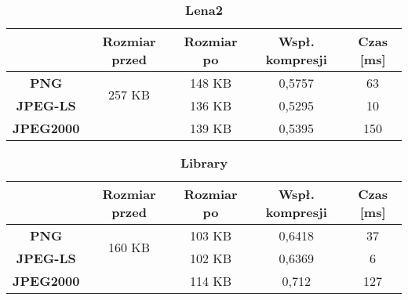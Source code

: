 \begin{table}[!h]
	\centering
	\caption{\textbf{Lena2}}
	\label{my-label}
	\begin{tabular}{|c|c|c|c|c|}                                             
		\hline
		& \textbf{Rozmiar przed} & \textbf{Rozmiar po} & \textbf{Wspł. kompresji} & \textbf{Czas {[}ms{]}} \\ \hline 
		\textbf{PNG}      &          \multicolumn{1}{c|}{\multirow{2}{*}{257 KB}}             &      148 KB               &       0,5757                   &           63                   \\\cline{3-5}
		\textbf{JPEG-LS}  &                        &        136 KB             &         0,5295                 &       10                   \\\cline{3-5}
		\textbf{JPEG2000} &                        &      139 KB               &          0,5395                &       150               \\ \hline
	\end{tabular}
\end{table}

\begin{table}[!h]
	\centering
	\caption{\textbf{Library}}
	\label{my-label}
	\begin{tabular}{|c|c|c|c|c|}                                             
		\hline
		& \textbf{Rozmiar przed} & \textbf{Rozmiar po} & \textbf{Wspł. kompresji} & \textbf{Czas {[}ms{]}} \\ \hline 
		\textbf{PNG}      &          \multicolumn{1}{c|}{\multirow{2}{*}{160 KB}}             &      103 KB               &    0,6418                      &           37                  \\\cline{3-5}
		\textbf{JPEG-LS}  &                        &     102 KB                &        0,6369                  &           6               \\\cline{3-5}
		\textbf{JPEG2000} &                        &     114 KB                &        0,712                  &        127              \\ \hline
	\end{tabular}
\end{table}

